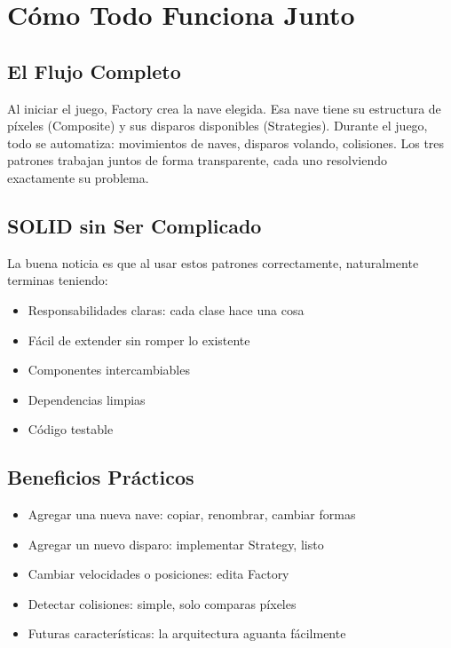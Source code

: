 \documentclass[12pt]{article}
\begin{document}
\newpage
\section{Cómo Todo Funciona Junto}

\subsection{El Flujo Completo}

Al iniciar el juego, Factory crea la nave elegida. Esa nave tiene su estructura de píxeles (Composite) y sus disparos disponibles (Strategies). Durante el juego, todo se automatiza: movimientos de naves, disparos volando, colisiones. Los tres patrones trabajan juntos de forma transparente, cada uno resolviendo exactamente su problema.

\subsection{SOLID sin Ser Complicado}

La buena noticia es que al usar estos patrones correctamente, naturalmente terminas teniendo:
\begin{itemize}
    \item Responsabilidades claras: cada clase hace una cosa
    \item Fácil de extender sin romper lo existente
    \item Componentes intercambiables
    \item Dependencias limpias
    \item Código testable
\end{itemize}

\subsection{Beneficios Prácticos}

\begin{itemize}
    \item Agregar una nueva nave: copiar, renombrar, cambiar formas
    \item Agregar un nuevo disparo: implementar Strategy, listo
    \item Cambiar velocidades o posiciones: edita Factory
    \item Detectar colisiones: simple, solo comparas píxeles
    \item Futuras características: la arquitectura aguanta fácilmente
\end{itemize}
\end{document}
